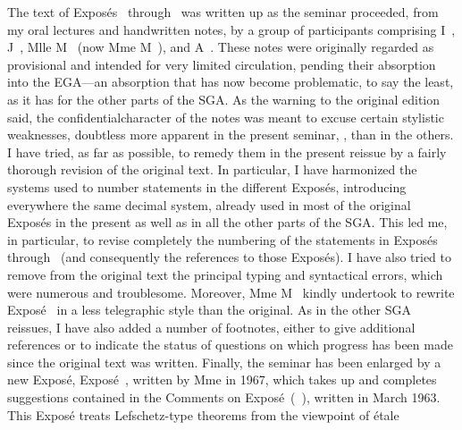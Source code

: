 The text of Expos\'es~ through~ was written up as the
seminar proceeded, from my oral lectures and handwritten notes, by a group
of participants comprising I\ptbl~,
J\ptbl~, Mlle M\ptbl~ (now
Mme M\ptbl~), and A\ptbl~.
These notes were originally regarded as provisional and intended for very
limited circulation, pending their absorption into the EGA---an absorption
that has now become problematic, to say the least, as it has for the other
parts of the SGA. As the warning to the original edition said, the
\og confidential\fg character of the notes was meant to excuse certain
\og stylistic weaknesses\fg, doubtless more apparent in the present
seminar, , than in the others. I have tried, as far as possible, to
remedy them in the present reissue by a fairly thorough revision of the
original text. In particular, I have harmonized the systems used to number
statements in the different Expos\'es, introducing everywhere the same
decimal system, already used in most of the original Expos\'es in the
present  as well as in all the other parts of the SGA. This led me,
in particular, to revise completely the numbering of
the statements in Expos\'es~ through~\pageoriginale
(and consequently the references to those Expos\'es). I have also tried to remove from the original text the principal
typing and syntactical errors, which were numerous and troublesome.
Moreover, Mme M\ptbl~ kindly undertook to rewrite
Expos\'e~ in a less telegraphic style than the original. As in the
other SGA reissues, I have also added a number of footnotes, either to give
additional references or to indicate the status of questions on which
progress has been made since the original text was written. Finally, the
seminar has been enlarged by a new Expos\'e, 
Expos\'e~, written by Mme
 in 1967, which takes up and
completes suggestions contained in the \og Comments on
Expos\'e~\fg (~), written in March 1963.
This Expos\'e treats Lefschetz-type theorems from the viewpoint of \'etale
